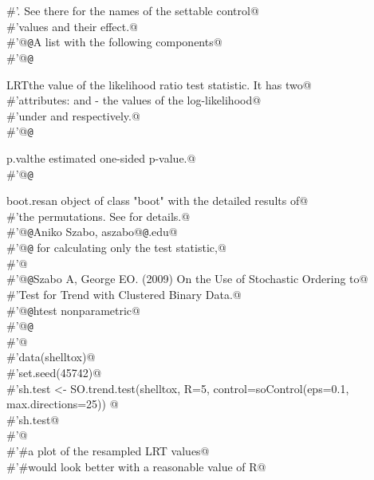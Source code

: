 \documentclass[reqno]{amsart}
\begin{document}
\begin{flushleft}
\begin{list}{}{}
\mbox{}\verb@#'.  See there for the names of the settable control@\\
\mbox{}\verb@#'values and their effect.@\\
\mbox{}\verb@#'@{\tt @}\verb@return A list with the following components@\\
\mbox{}\verb@#'@{\tt @}\verb@return \item{LRT}{the value of the likelihood ratio test statistic. It has two@\\
\mbox{}\verb@#'attributes:  and  - the values of the log-likelihood@\\
\mbox{}\verb@#'under  and  respectively.}@\\
\mbox{}\verb@#'@{\tt @}\verb@return \item{p.val}{the estimated one-sided p-value.}@\\
\mbox{}\verb@#'@{\tt @}\verb@return \item{boot.res}{an object of class "boot" with the detailed results of@\\
\mbox{}\verb@#'the permutations.  See  for details.}@\\
\mbox{}\verb@#'@{\tt @}\verb@author Aniko Szabo, aszabo@{\tt @}\verb@mcw.edu@\\
\mbox{}\verb@#'@{\tt @}\verb@seealso {} for calculating only the test statistic,@\\
\mbox{}\verb@#'@\\
\mbox{}\verb@#'@{\tt @}\verb@references Szabo A, George EO. (2009) On the Use of Stochastic Ordering to@\\
\mbox{}\verb@#'Test for Trend with Clustered Binary Data.@\\
\mbox{}\verb@#'@{\tt @}\verb@keywords htest nonparametric@\\
\mbox{}\verb@#'@{\tt @}\verb@examples@\\
\mbox{}\verb@#'@\\
\mbox{}\verb@#'data(shelltox)@\\
\mbox{}\verb@#'set.seed(45742)@\\
\mbox{}\verb@#'sh.test <- SO.trend.test(shelltox, R=5, control=soControl(eps=0.1, max.directions=25)) @\\
\mbox{}\verb@#'sh.test@\\
\mbox{}\verb@#'@\\
\mbox{}\verb@#'#a plot of the resampled LRT values@\\
\mbox{}\verb@#'#would look better with a reasonable value of R@\\

\end{list}
\end{flushleft}
\end{document}
